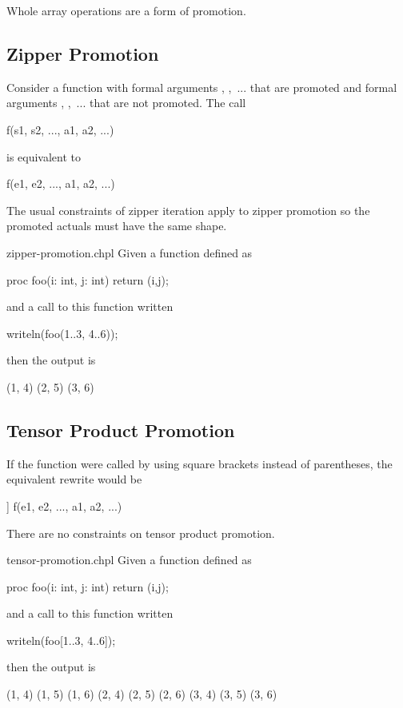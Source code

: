 Whole array operations are a form of promotion.

\subsection{Zipper Promotion}
\label{Zipper_Promotion}

Consider a function  with formal
arguments , ,~... that are promoted and formal
arguments , ,~... that are not promoted.  The call
\begin{chapel}
f(s1, s2, ..., a1, a2, ...)
\end{chapel}
is equivalent to
\begin{chapel}
[(e1, e2, ...) in (s1, s2, ...)] f(e1, e2, ..., a1, a2, ...)
\end{chapel}
The usual constraints of zipper iteration apply to zipper promotion so
the promoted actuals must have the same shape.

\begin{chapelexample}{zipper-promotion.chpl}
Given a function defined as
\begin{chapel}
proc foo(i: int, j: int) {
  return (i,j);
}
\end{chapel}
and a call to this function written
\begin{chapel}
writeln(foo(1..3, 4..6));
\end{chapel}
then the output is
\begin{chapelprintoutput}
(1, 4) (2, 5) (3, 6)
\end{chapelprintoutput}
\end{chapelexample}

\subsection{Tensor Product Promotion}
\label{Tensor_Product_Promotion}

If the function  were called by using square brackets instead
of parentheses, the equivalent rewrite would be
\begin{chapel}
[(e1, e2, ...) in [s1, s2, ...]] f(e1, e2, ..., a1, a2, ...)
\end{chapel}
There are no constraints on tensor product promotion.

\begin{chapelexample}{tensor-promotion.chpl}
Given a function defined as
\begin{chapel}
proc foo(i: int, j: int) {
  return (i,j);
}
\end{chapel}
and a call to this function written
\begin{chapel}
writeln(foo[1..3, 4..6]);
\end{chapel}
then the output is
\begin{chapelprintoutput}
(1, 4) (1, 5) (1, 6) (2, 4) (2, 5) (2, 6) (3, 4) (3, 5) (3, 6)
\end{chapelprintoutput}
\end{chapelexample}


